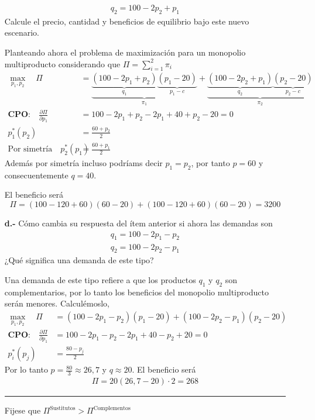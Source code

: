 \begin{itemize}
\begin{align*}
        q_2 = 100 -2p_2 +p_1
    \end{align*}
    Calcule el precio, cantidad y beneficios de equilibrio bajo este nuevo escenario.
    \begin{solution}
        Planteando ahora el problema de maximización para un monopolio multiproducto considerando que $\Pi = \sum_{i = 1}^2 \pi_i$
        \begin{align*}
            \max_{p_1,p_2} \quad \Pi &= \underbrace{\underbrace{(100-2p_1+p_2)}_{q_1}\underbrace{(p_1-20)}_{p_1-c} }_{\pi_1}+ \underbrace{\underbrace{(100-2p_2+p_1)}_{q_2}\underbrace{(p_2-20)}_{p_2-c}}_{\pi_2} \\
            \textbf{CPO:} \quad \frac{\partial \Pi}{\partial p_1} &= 100-2p_1+p_2-2p_1+40+p_2-20 = 0 \\
            p^*_1(p_2) &= \frac{60+p_2}{2} \\
            \text{Por simetría} \quad  p_2^*(p_1) &= \frac{60+p_1}{2}
        \end{align*}
        Además por simetría incluso podríams decir $p_1 = p_2$, por tanto $p = 60$ y consecuentemente $q= 40$.

        El beneficio será 
        \begin{equation*}
            \Pi = (100-120+60)(60-20) + (100-120+60)(60-20) = 3200
        \end{equation*}
    \end{solution}
    \item [\textbf{d.-}] Cómo cambia su respuesta del ítem anterior si ahora las demandas son
    \begin{align*}
        q_1 = 100 - 2p_1 -p_2 \\
        q_2 = 100-2p_2-p_1    
    \end{align*}
    ¿Qué significa una demanda de este tipo?
    \begin{solution}
        Una demanda de este tipo refiere a que los productos $q_1$ y $q_2$ son complementarios, por lo tanto los beneficios del monopolio multiproducto serán menores. Calculémoslo,
        \begin{align*}
            \max_{p_1,p_2} \quad \Pi &= (100-2p_1-p_2)(p_1-20) + (100-2p_2-p_1)(p_2-20) \\
            \textbf{CPO:} \quad \frac{\partial \Pi}{\partial p_1} &= 100-2p_1-p_2-2p_1 + 40-p_2+20 = 0 \\
            p^*_i(p_j) &= \frac{80-p_j}{2}
        \end{align*}
        Por lo tanto $p = \frac{80}{3}\approx 26,7$ y $q \approx 20$. El beneficio será
        \begin{align*}
            \Pi = 20(26,7-20)\cdot 2 = 268
        \end{align*}
        
        \rule{\linewidth}{0.4pt}
        
        Fijese que $\Pi^{\text{Sustitutos}}>\Pi^{\text{Complementos}}$
    \end{solution}
    
\end{itemize}